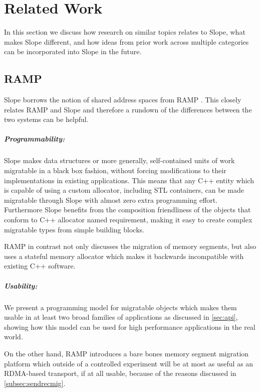 \chapter{Related Work}
\label{chap:related}
In this section we discuss how research on similar topics relates to
Slope, what makes Slope different, and how ideas from prior work across
multiple categories can be incorporated into Slope in the future.

\section{RAMP}
Slope borrows the notion of shared address spaces from RAMP
\cite{memon2018ramp}. This closely relates RAMP and Slope and therefore
a rundown of the differences between the two systems can be helpful.

\paragraph{Programmability:}
Slope makes data structures or more generally, self-contained units of
work migratable in a black box fashion, without forcing modifications to
their implementations in existing applications.
This means that any C++ entity which is capable of using a custom
allocator, including STL containers, can be made migratable through Slope
with almost zero extra programming effort. Furthermore Slope benefits
from the composition friendliness of the objects that conform to C++ 
allocator named requirement, making it easy to create complex migratable
types from simple building blocks.

RAMP in contrast not only discusses the
migration of memory segments,
but also uses a stateful memory allocator which makes it
backwards incompatible with existing C++ software.

\paragraph{Usability:}
We present a programming model for migratable objects which makes them
usable in at least two broad families of applications as discussed in
\autoref{sec:api}, showing how this model can be used for high performance
applications in the real world.

On the other hand, RAMP introduces a bare bones memory segment migration
platform which outside of a controlled experiment will be at most as
useful as an RDMA-based transport, if at all usable,
because of the reasons discussed in \autoref{subsec:sendrecmig}.


